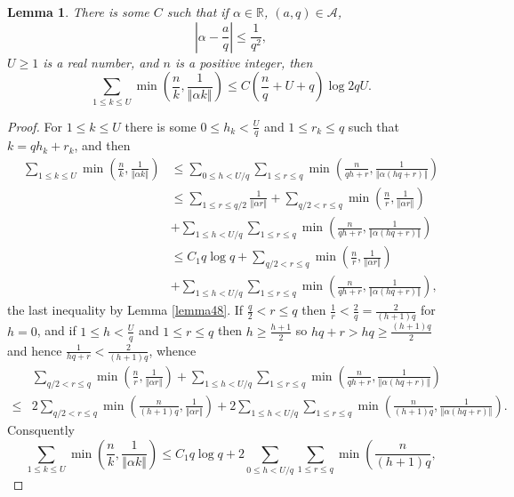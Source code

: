 \documentclass{amsart}
\newcommand{\norm}[1]{\left\Vert #1 \right\Vert}
\newtheorem{lemma}[theorem]{Lemma}
\begin{document}
\begin{lemma}
There is some $C$ such that if $\alpha \in \mathbb{R}$, $(a,q) \in \mathscr{A}$, 
\[
\left|\alpha - \frac{a}{q} \right| \leq \frac{1}{q^2},
\]
 $U \geq 1$ is a real number, and $n$ is a positive integer, then
\[
\sum_{1 \leq k \leq U} \min\left( \frac{n}{k}, \frac{1}{\norm{\alpha k}} \right) \leq C
\left(\frac{n}{q}+U+q\right) \log 2qU.
\]
\label{lemma410}
\end{lemma}
\begin{proof}
For $1 \leq k \leq U$ there is some $0 \leq h_k < \frac{U}{q}$ and
$1 \leq r_k \leq q$ such that $k=q h_k  + r_k$, and then
\begin{align*}
\sum_{1 \leq k \leq U} \min\left( \frac{n}{k}, \frac{1}{\norm{\alpha k}} \right)
&\leq \sum_{0 \leq h < U/q} \sum_{1 \leq r \leq q} \min\left(\frac{n}{qh+r},\frac{1}{\norm{\alpha(hq+r)}}\right)\\
&\leq \sum_{1 \leq r \leq q/2} \frac{1}{\norm{\alpha r}}+\sum_{q/2<r \leq q}  \min\left(\frac{n}{r},\frac{1}{\norm{\alpha r}}\right)\\
&+\sum_{1 \leq h < U/q} \sum_{1 \leq r \leq q}\min\left(\frac{n}{qh+r},\frac{1}{\norm{\alpha(hq+r)}}\right)\\
&\leq C_1  q \log q 
+\sum_{q/2<r \leq q}  \min\left(\frac{n}{r},\frac{1}{\norm{\alpha r}}\right)\\
&+\sum_{1 \leq h < U/q} \sum_{1 \leq r \leq q}\min\left(\frac{n}{qh+r},\frac{1}{\norm{\alpha(hq+r)}}\right),
\end{align*}
the last inequality by Lemma \ref{lemma48}.
If $\frac{q}{2} < r \leq q$ then 
$\frac{1}{r} < \frac{2}{q} = \frac{2}{(h+1)q}$ for $h=0$, and if
$1 \leq h < \frac{U}{q}$ and $1 \leq r \leq q$ then $h \geq \frac{h+1}{2}$ so
$hq+r > hq \geq \frac{(h+1)q}{2}$ and hence
$\frac{1}{hq+r} < \frac{2}{(h+1)q}$, whence
\[
\begin{split}
&\sum_{q/2<r \leq q}  \min\left(\frac{n}{r},\frac{1}{\norm{\alpha r}}\right)+
\sum_{1 \leq h < U/q} \sum_{1 \leq r \leq q}\min\left(\frac{n}{qh+r},\frac{1}{\norm{\alpha(hq+r)}}\right)\\
\leq&2\sum_{q/2<r \leq q}  \min\left( \frac{n}{(h+1)q},\frac{1}{\norm{\alpha r}}\right)+
2\sum_{1 \leq h < U/q}  \sum_{1 \leq r \leq q} \min\left( \frac{n}{(h+1)q},\frac{1}{\norm{\alpha(hq+r)}}\right).
\end{split}
\]
Consquently 
\[
\sum_{1 \leq k \leq U} \min\left( \frac{n}{k}, \frac{1}{\norm{\alpha k}} \right)
\leq C_1 q \log q + 2 \sum_{0 \leq h < U/q} \sum_{1 \leq r \leq q} \min\left( \frac{n}{(h+1)q},
\]
\end{proof}
\end{document}
